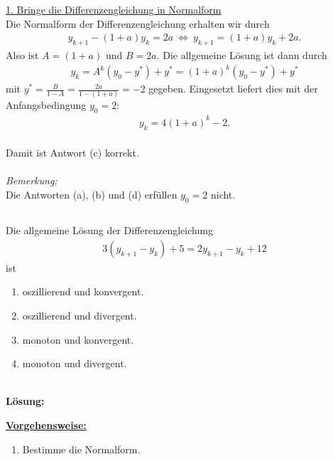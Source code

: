 \underline{1. Bringe die Differenzengleichung in Normalform}\\
Die Normalform der Differenzengleichung erhalten wir durch
\begin{align*}
y_{k+1} -(1+a) y_k = 2a
\ \Leftrightarrow \
y_{k+1}
= (1+a ) y_k + 2a.
\end{align*}
Also ist $ A = (1+a) $ und $ B = 2a $.
Die allgemeine Lösung ist dann durch
\begin{align*}
y_k = A^k(y_0 - y^\ast) + y^\ast = (1+a)^k(y_0 - y^\ast) + y^\ast
\end{align*}
mit $ y^\ast = \frac{B}{1 - A} =  \frac{2a}{1-(1+a)} = -2 $ gegeben.
Eingesetzt liefert dies mit der Anfangsbedingung $ y_0 = 2 $:
\begin{align*}
y_k = 4 (1+a)^k -2.
\end{align*}
\ \\
Damit ist Antwort (c) korrekt.\\
\\
\textit{Bemerkung:}\\
Die Antworten (a), (b) und (d) erfüllen $ y_0 =2 $ nicht.\\




\newpage



\subsection*{}
Die allgemeine Lösung der Differenzengleichung
\begin{align*}
3 (y_{k+1}   -y_k  )+ 5 = 2 y_{k+1} -y_k + 12 
\end{align*}
ist
\renewcommand{\labelenumi}{(\alph{enumi})}
\begin{enumerate}
	\item
	oszillierend und konvergent.
	\item
	oszillierend und divergent.	
	\item 
	monoton und konvergent.
	\item
	monoton und divergent.
\end{enumerate}
\ \\
\textbf{Lösung:}
\begin{mdframed}
\underline{\textbf{Vorgehensweise:}}
\renewcommand{\labelenumi}{\theenumi.}
\begin{enumerate}
\item Bestimme die Normalform.
\end{enumerate}
\end{mdframed}

